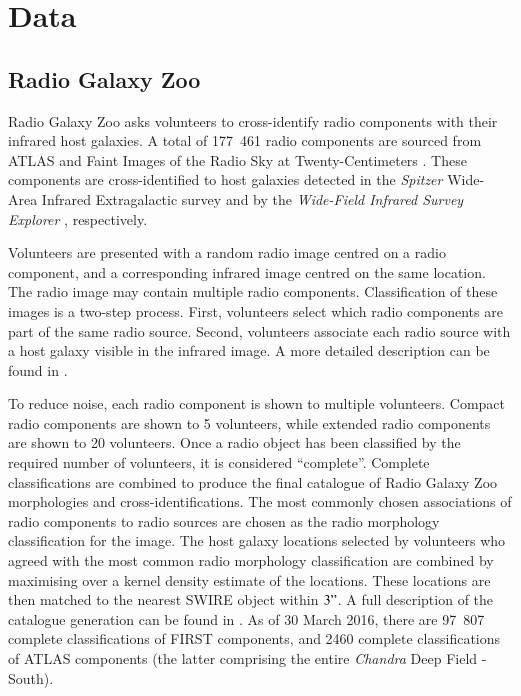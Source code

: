 \documentclass[fleqn,usenatbib,usedcolumn]{mnras}
\begin{document}
\section{Data}\label{data}

  \subsection{Radio Galaxy Zoo}\label{sec:rgz}

    Radio Galaxy Zoo asks volunteers to cross-identify radio components with
    their infrared host galaxies. A total of 177~461 radio components are
    sourced from ATLAS \citep{franzen15} and Faint Images of the Radio
    Sky at Twenty-Centimeters \citep[FIRST;][]{white97first}. These components
    are cross-identified to host galaxies detected in the \emph{Spitzer} Wide-
    Area Infrared Extragalactic survey \citep[SWIRE;][]{lonsdale03swire} and
    by the \emph{Wide-Field Infrared Survey Explorer}
    \citep[WISE;][]{wright10wise}, respectively.

    Volunteers are presented with a random radio image centred on a radio
    component, and a corresponding infrared image centred on the same
    location. The radio image may contain multiple radio components.
    Classification of these images is a two-step process. First, volunteers
    select which radio components are part of the same radio source. Second,
    volunteers associate each radio source with a host galaxy visible in the
    infrared image. A more detailed description can be found in
    \citet{banfield15}.

    To reduce noise, each radio component is shown to multiple volunteers.
    Compact radio components are shown to 5 volunteers, while extended radio
    components are shown to 20 volunteers. Once a radio object has been
    classified by the required number of volunteers, it is considered
    ``complete''. Complete classifications are combined to produce the final
    catalogue of Radio Galaxy Zoo morphologies and cross-identifications. The
    most commonly chosen associations of radio components to radio sources are
    chosen as the radio morphology classification for the image. The host
    galaxy locations selected by volunteers who agreed with the most common
    radio morphology classification are combined by maximising over a kernel
    density estimate of the locations. These locations are then matched to the
    nearest SWIRE object within $3"$. A full description of the catalogue
    generation can be found in \citet{wong17}. As of 30 March 2016, there are
    97~807 complete classifications of FIRST components, and 2460 complete
    classifications of ATLAS components (the latter comprising the entire
    \emph{Chandra} Deep Field - South).
\end{document}
